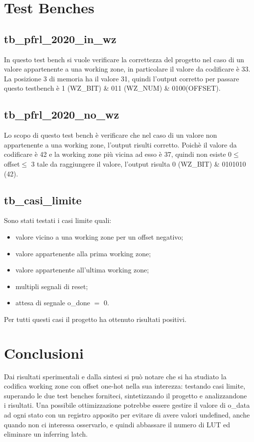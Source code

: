 \documentclass[12pt]{article}
\begin{document}
\section{Test Benches}
\subsection{\textbf{tb\_pfrl\_2020\_in\_wz}}
In questo test bench si vuole verificare la correttezza del progetto nel caso di un valore appartenente a una working zone, in particolare il valore da codificare è 33.
La posizione 3 di memoria ha il valore 31, quindi l'output corretto per passare questo testbench è 1 (WZ\_BIT) \& 011 (WZ\_NUM) \& 0100(OFFSET).
\subsection{\textbf{tb\_pfrl\_2020\_no\_wz}}
Lo scopo di questo test bench è verificare che nel caso di un valore non appartenente a una working zone, l'output risulti corretto.
Poichè il valore da codificare è 42 e la working zone più vicina ad esso è 37, quindi non esiste 0\(\leq\)offset\(\leq\) 3 tale da raggiungere il valore, l'output risulta 0 (WZ\_BIT) \& 0101010 (42).
\subsection{\textbf{tb\_casi\_limite}}
Sono stati testati i casi limite quali:
\begin{itemize}
    \item valore vicino a una working zone per un offset negativo;
    \item valore appartenente alla prima working zone;
    \item valore appartenente all'ultima working zone;
    \item multipli segnali di reset;
    \item attesa di segnale o\_done \(=\) 0.
\end{itemize}
Per tutti questi casi il progetto ha ottenuto risultati positivi.
\section{Conclusioni}
Dai risultati sperimentali e dalla sintesi si può notare che si ha studiato la codifica working zone con offset one-hot nella sua interezza: testando casi limite, superando le due test benches forniteci, sintetizzando il progetto e analizzandone i risultati.
Una possibile ottimizzazione potrebbe essere gestire il valore di o\_data ad ogni stato con un registro apposito per evitare di avere valori undefined, anche quando non ci interessa osservarlo, e quindi abbassare il numero di LUT ed eliminare un inferring latch.
\end{document}

